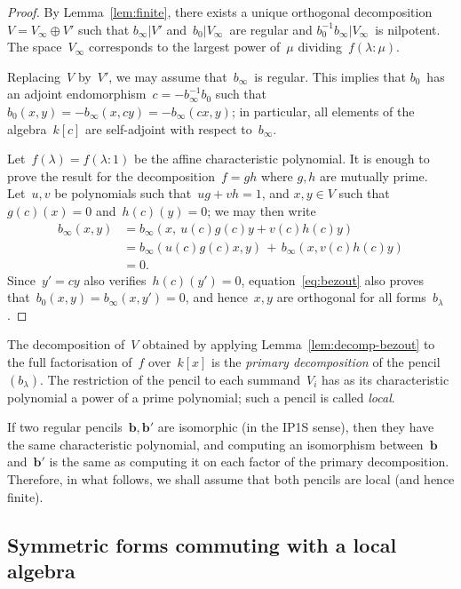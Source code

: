 \documentclass{article}%
\begin{document}
\begin{proof}
By Lemma~\ref{lem:finite}, there exists
a unique orthogonal decomposition~$V = V_{∞} ⊕ V'$
such that $b_{∞} | V'$ and~$b_{0} | V_{∞}$~are regular
and $b_{0}^{-1} b_{∞} | V_{∞}$~is nilpotent.
The space~$V_{∞}$ corresponds to the largest power of~$μ$ dividing~$f(λ:μ)$.

Replacing~$V$ by~$V'$, we may assume that~$b_{∞}$~is regular.
This implies that $b_0$~has an adjoint endomorphism~$c = -b_{∞}^{-1} b_0$
such that~$b_0(x,y) = -b_{∞}(x, c y) = -b_{∞}(c x, y)$;
in particular, all elements of the algebra~$k[c]$
are self-adjoint with respect to~$b_{∞}$.

Let~$f(λ) = f(λ: 1)$ be the affine characteristic polynomial.
It is enough to prove the result for the decomposition~$f = gh$
where $g, h$ are mutually prime.
Let~$u, v$ be polynomials such that~$ug + vh = 1$,
and $x, y ∈ V$ such that~$g(c)(x) = 0$ and~$h(c)(y) = 0$;
we may then write
\begin{equation}\label{eq:bezout}
\begin{split}
b_{∞} (x, y) & = b_{∞} (x,\: u(c) g(c) y + v(c) h(c) y ) \\
&= b_{∞} (u(c) g(c) x, y) \,+\, b_{∞} (x, v(c) h(c) y) \\
&= 0.
\end{split}
\end{equation}
Since~$y' = c y$ also verifies~$h(c)(y') = 0$, equation~\eqref{eq:bezout}
also proves that~$b_{0}(x,y) = b_{∞}(x,y') = 0$, and hence~$x, y$ are
orthogonal for all forms~$b_{λ}$.
\end{proof}%

The decomposition of~$V$ obtained by applying
Lemma~\ref{lem:decomp-bezout} to the full factorisation of~$f$
over~$k[x]$ is the \emph{primary decomposition} of the pencil~$(b_{λ})$.
The restriction of the pencil to each summand~$V_i$ has as its
characteristic polynomial a power of a prime polynomial;
such a pencil is called \emph{local}.

If two regular pencils~$\bm{b}, \bm{b}'$ are isomorphic (in the IP1S sense),
then they have the same characteristic polynomial,
and computing an isomorphism between~$\bm{b}$ and~$\bm{b}'$
is the same as computing it on each factor of the primary decomposition.
Therefore, in what follows, we shall assume that
both pencils are local (and hence finite).

\subsection{Symmetric forms commuting with a local algebra}%
\label{ss:commute}
\end{document}
